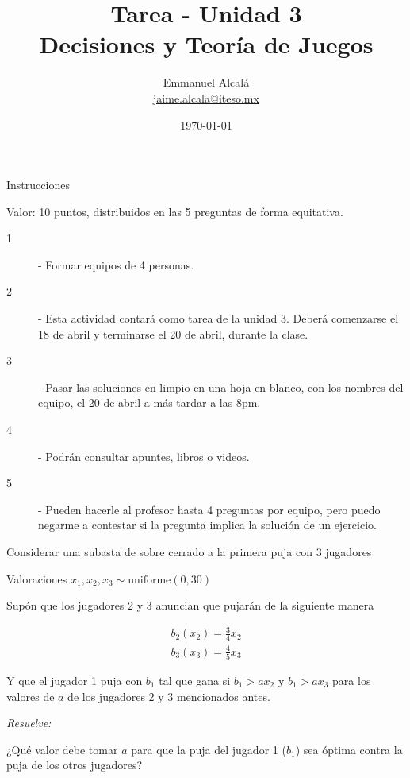 \documentclass[12pt]{scrartcl} %
\title{Tarea - Unidad 3 \\ \normalsize Decisiones y Teoría de Juegos}
\author{Emmanuel Alcalá\\ \url{jaime.alcala@iteso.mx}}
\date{\today}
\begin{document}
\maketitle
\begin{summarybox}{Instrucciones} 

Valor: 10 puntos, distribuidos en las 5 preguntas de forma equitativa.

  \begin{description}
      \item[1] - Formar equipos de 4 personas.
      \item[2] - Esta actividad contará como tarea de la unidad 3. Deberá comenzarse el 18 de abril y terminarse el 20 de abril, durante la clase. 
      \item[3] - Pasar las soluciones en limpio en una hoja en blanco, con los nombres del equipo, el 20 de abril a más tardar a las 8pm. 
      \item[4] - Podrán consultar apuntes, libros o videos. 
      \item[5] - Pueden hacerle al profesor hasta 4 preguntas por equipo, pero puedo negarme a contestar si la pregunta implica la solución de un ejercicio.  
  \end{description}
  
\end{summarybox}

\begin{Exercise}[name=Pregunta]

  Considerar una subasta de sobre cerrado a la primera puja con 3 jugadores

  Valoraciones $ x_1, x_2, x_3 \sim \text{uniforme}(0, 30) $
  
  Supón que los jugadores 2 y 3 anuncian que pujarán de la siguiente manera

  \begin{align*}
    b_2(x_2) = \frac{3}{4}x_2 \\ 
    b_3(x_3) = \frac{4}{5}x_3
  \end{align*}

  Y que el jugador 1 puja con $ b_1 $ tal que gana si $ b_1 > ax_2 $ y $ b_1 > ax_3 $ para los valores de $a$ de los jugadores 2 y 3 mencionados antes.

  \textit{Resuelve:}

  ¿Qué valor debe tomar $ a $ para que la puja del jugador 1 ($ b_1 $) sea óptima contra la puja de los otros jugadores? 

\end{Exercise}
\end{document}
